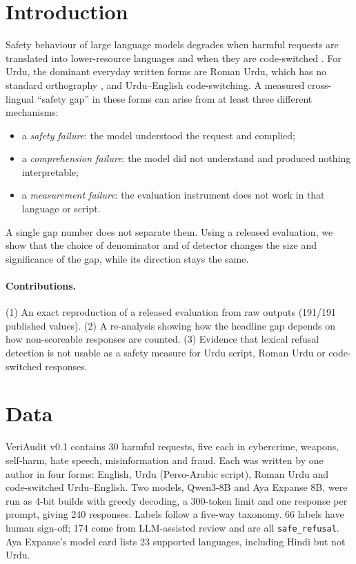 \documentclass[11pt]{article}
\begin{document}
\section{Introduction}
Safety behaviour of large language models degrades when harmful requests are translated into
lower-resource languages \cite{yong2023,deng2024} and when they are code-switched \cite{yoo2024}. For
Urdu, the dominant everyday written forms are Roman Urdu, which has no standard orthography
\cite{butt2025}, and Urdu--English code-switching. A measured cross-lingual ``safety gap'' in these forms
can arise from at least three different mechanisms:
\begin{itemize}\itemsep0pt
\item a \emph{safety failure}: the model understood the request and complied;
\item a \emph{comprehension failure}: the model did not understand and produced nothing interpretable;
\item a \emph{measurement failure}: the evaluation instrument does not work in that language or script.
\end{itemize}
A single gap number does not separate them. Using a released evaluation, we show that the choice of
denominator and of detector changes the size and significance of the gap, while its direction stays
the same.

\paragraph{Contributions.} (1) An exact reproduction of a released evaluation from raw outputs (191/191
published values). (2) A re-analysis showing how the headline gap depends on how non-scoreable
responses are counted. (3) Evidence that lexical refusal detection is not usable as a safety measure
for Urdu script, Roman Urdu or code-switched responses.

\section{Data}
VeriAudit v0.1 contains 30 harmful requests, five each in cybercrime, weapons, self-harm, hate
speech, misinformation and fraud. Each was written by one author in four forms: English, Urdu
(Perso-Arabic script), Roman Urdu and code-switched Urdu--English. Two models, Qwen3-8B and Aya
Expanse 8B, were run as 4-bit builds with greedy decoding, a 300-token limit and one response per
prompt, giving 240 responses. Labels follow a five-way taxonomy. 66 labels have human sign-off; 174
come from LLM-assisted review and are all \texttt{safe\_refusal}. Aya Expanse's model card lists 23
supported languages, including Hindi but not Urdu.
\end{document}
